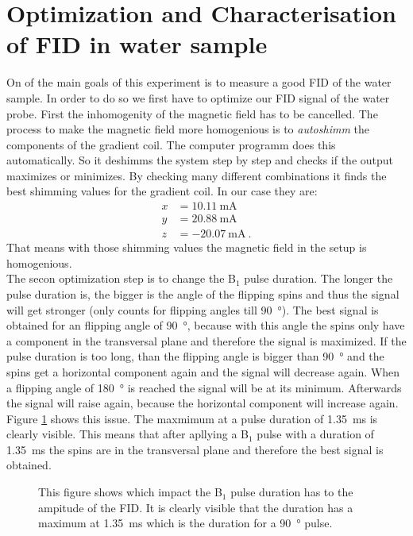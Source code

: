 \section{Optimization and Characterisation of FID in water sample}
\label{sec:OptimizationandCharacterisationofFIDinwatersample}

On of the main goals of this experiment is to measure a good FID of the water sample. In order to do so we first have to optimize our FID signal of the water probe.\newline
First the inhomogenity of the magnetic field has to be cancelled. The process to make the magnetic field more homogenious is to \textit{autoshimm} the components of the gradient coil. The computer programm does this automatically. So it deshimms the system step by step and checks if the output maximizes or minimizes. By checking many different combinations it finds the best shimming values for the gradient coil. In our case they are:
\begin{align*}
    x &= \SI{10.11}{\milli \ampere}\\
    y &= \SI{20.88}{\milli \ampere}\\
    z &= \SI{-20.07}{\milli \ampere} \ .
    \label{eq: shimmingvalues}
\end{align*}
That means with those shimming values the magnetic field in the setup is homogenious.
\\
The secon optimization step is to change the B$_1$ pulse duration. The longer the pulse duration is, the bigger is the angle of the flipping spins and thus the signal will get stronger (only counts for flipping angles till \SI{90}{\degree}). The best signal is obtained for an flipping angle of \SI{90}{\degree}, because with this angle the spins only have a component in the transversal plane and therefore the signal is maximized. If the pulse duration is too long, than the flipping angle is bigger than \SI{90}{\degree} and the spins get a horizontal component again and the signal will decrease again. When a flipping angle of \SI{180}{\degree} is reached the signal will be at its minimum. Afterwards the signal will raise again, because the horizontal component will increase again. Figure \ref{fig:B1dauer} shows this issue. The maxmimum at a pulse duration of \SI{1.35}{\milli \second} is clearly visible. This means that after apllying a B$_1$ pulse with a duration of \SI{1.35}{\milli \second} the spins are in the transversal plane and therefore the best signal is obtained.
\begin{figure}[H]
    \centering
    
    \caption[This figure shows which impact the B$_1$ pulse duration has to the ampitude of the FID.]{This figure shows which impact the B$_1$ pulse duration has to the ampitude of the FID. It is clearly visible that the duration has a maximum at \SI{1.35}{\milli \second} which is the duration for a \SI{90}{\degree} pulse.}
    \label{fig:B1dauer}
\end{figure}

